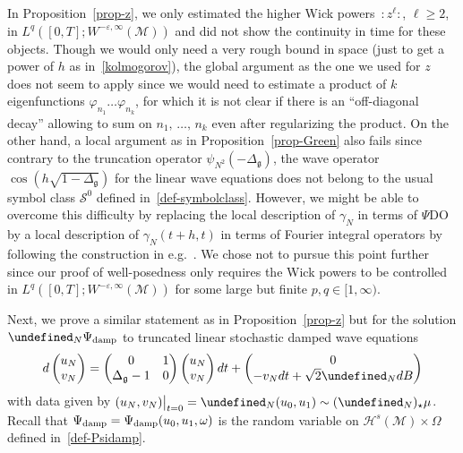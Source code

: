 \documentclass[AHL,Unicode,longabstracts,published]{cedram}
\newcommand{\damp}{\textup{damp}}
\let\P= \undefined
\newcommand{\P}{\mathbf{P}}
\renewcommand{\S}{\mathcal{S}}
\newcommand{\M}{\mathcal{M}}
\renewcommand{\H}{\mathcal{H}}
\newcommand{\g}{\mathfrak{g}}
\newcommand{\Dlg}{\Delta_{\g}}
\newcommand{\eps}{\varepsilon}
\renewcommand{\o}{\omega}
\renewcommand{\O}{\Omega}
\begin{document}
\begin{rema}\label{rk-FIO}
In Proposition~\ref{prop-z}, we only estimated the higher Wick powers~$:z^{\ell}:$, $\ell \geq 2$, in $L^q([0,T];W^{-\eps,\infty}(\M))$ and did not show the continuity in time for these objects. Though we would only need a very rough bound in space (just to get a power of $h$ as in~\eqref{kolmogorov}), the global argument as the one we used for $z$ does not seem to apply since we would need to estimate a product of $k$ eigenfunctions $\varphi_{n_1}\dots \varphi_{n_k}$, for which it is not clear if there is an ``off-diagonal decay'' allowing to sum on $n_1,\,\dots,\,n_k$ even after regularizing the product. On the other hand, a local argument as in Proposition~\ref{prop-Green} also fails since contrary to the truncation operator $\psi_{N^2}(-\Dlg)$, the wave operator $\cos(h\sqrt{1-\Dlg})$ for the linear wave equations does not belong to the usual symbol class $\S^0$ defined in~\eqref{def-symbolclass}. However, we might be able to overcome this difficulty by replacing the local description of $\gamma_N$ in terms of $\Psi$DO by a local description of $\gamma_N(t+h,t)$ in terms of Fourier integral operators by following the construction in e.g.~\cite{BGT,MSS}. We chose not to pursue this point further since our proof of well-posedness only requires the Wick powers to be controlled in $L^q([0,T];W^{-\eps,\infty}(\M))$ for some large but finite $p,q\in [1,\infty)$.
\end{rema}

Next, we prove a similar statement as in Proposition~\ref{prop-z} but for the solution $\P_N\Psi_\damp$ to truncated linear stochastic damped wave equations
\begin{equation}\label{truncLSDNLW}
d
\begin{pmatrix}
u_N\\v_N
\end{pmatrix} =
\begin{pmatrix}
0& 1\\\Dlg-1&0
\end{pmatrix}
\begin{pmatrix}
u_N\\v_N
\end{pmatrix}dt +
\begin{pmatrix}
0\\- v_Ndt+\sqrt{2}\P_NdB
\end{pmatrix}
\end{equation}
with data given by $(u_N,v_N)\big|_{t=0}=\P_N(u_0,u_1)\sim (\P_N)_{\star}\mu$. Recall that $\Psi_\damp\linebreak=\Psi_\damp(u_0,u_1,\o)$ is the random variable on $\H^s(\M)\times\O$ defined in~\eqref{def-Psidamp}.
\end{document}
